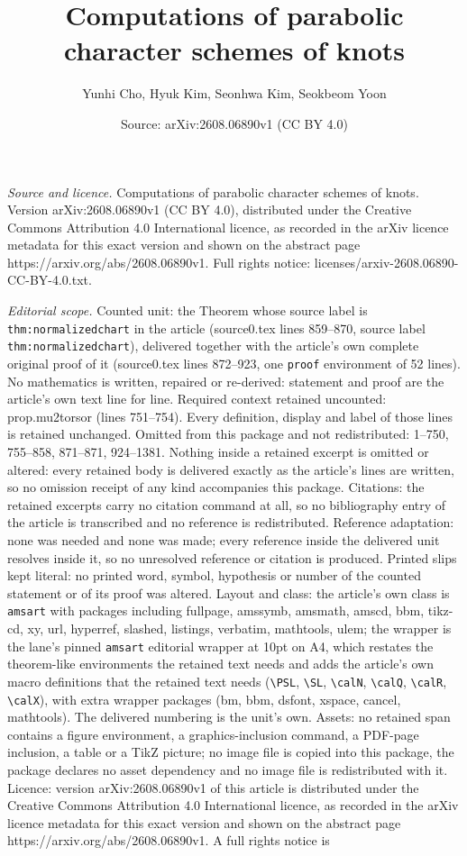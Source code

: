 \documentclass[10pt,a4paper]{amsart}
\title[Computations of parabolic character schemes of knots]{Computations of parabolic character schemes of knots}
\author{Yunhi Cho, Hyuk Kim, Seonhwa Kim, Seokbeom Yoon}
\date{Source: arXiv:2608.06890v1 (CC BY 4.0)}
\begin{document}
\maketitle

\noindent\emph{Source and licence.} Computations of parabolic character schemes of knots. Version arXiv:2608.06890v1 (CC BY 4.0), distributed under the Creative Commons Attribution 4.0 International licence, as recorded in the arXiv licence metadata for this exact version and shown on the abstract page https://arxiv.org/abs/2608.06890v1. Full rights notice: licenses/arxiv-2608.06890-CC-BY-4.0.txt.\par\smallskip

\noindent\textit{Editorial scope.} Counted unit: the Theorem whose source label is \texttt{thm:normalizedchart} in the article (source0.tex lines 859--870, source label \texttt{thm:normalizedchart}), delivered together with the article's own complete original proof of it (source0.tex lines 872--923, one \texttt{proof} environment of 52 lines). No mathematics is written, repaired or re-derived: statement and proof are the article's own text line for line. Required context retained uncounted: prop.mu2torsor (lines 751--754). Every definition, display and label of those lines is retained unchanged. Omitted from this package and not redistributed: 1--750, 755--858, 871--871, 924--1381. Nothing inside a retained excerpt is omitted or altered: every retained body is delivered exactly as the article's lines are written, so no omission receipt of any kind accompanies this package. Citations: the retained excerpts carry no citation command at all, so no bibliography entry of the article is transcribed and no reference is redistributed. Reference adaptation: none was needed and none was made; every reference inside the delivered unit resolves inside it, so no unresolved reference or citation is produced. Printed slips kept literal: no printed word, symbol, hypothesis or number of the counted statement or of its proof was altered. Layout and class: the article's own class is \texttt{amsart} with packages including fullpage, amssymb, amsmath, amscd, bbm, tikz-cd, xy, url, hyperref, slashed, listings, verbatim, mathtools, ulem; the wrapper is the lane's pinned \texttt{amsart} editorial wrapper at 10pt on A4, which restates the theorem-like environments the retained text needs and adds the article's own macro definitions that the retained text needs (\texttt{\textbackslash PSL}, \texttt{\textbackslash SL}, \texttt{\textbackslash calN}, \texttt{\textbackslash calQ}, \texttt{\textbackslash calR}, \texttt{\textbackslash calX}), with extra wrapper packages (bm, bbm, dsfont, xspace, cancel, mathtools). The delivered numbering is the unit's own. Assets: no retained span contains a figure environment, a graphics-inclusion command, a PDF-page inclusion, a table or a TikZ picture; no image file is copied into this package, the package declares no asset dependency and no image file is redistributed with it. Licence: version arXiv:2608.06890v1 of this article is distributed under the Creative Commons Attribution 4.0 International licence, as recorded in the arXiv licence metadata for this exact version and shown on the abstract page https://arxiv.org/abs/2608.06890v1. A full rights notice is 
\end{document}
